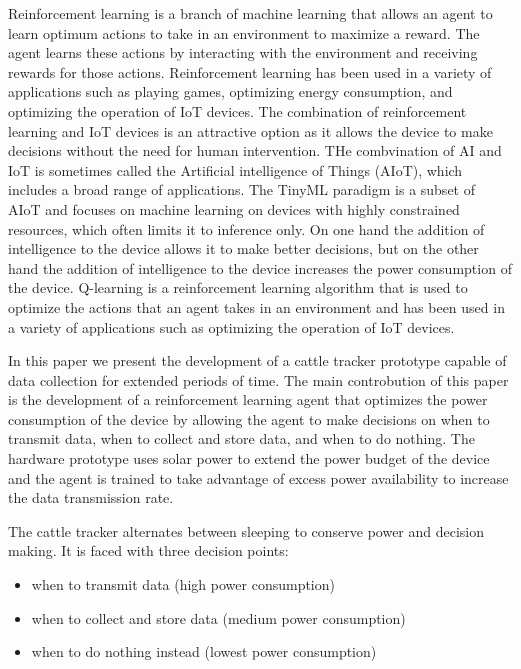 \documentclass[10pt]{cai}
\begin{document}
Reinforcement learning is a branch of machine learning that allows an agent to learn optimum actions to take in an environment to maximize a reward.
The agent learns these actions by interacting with the environment and receiving rewards for those actions.
Reinforcement learning has been used in a variety of applications such as playing games, optimizing energy consumption, and optimizing the operation of IoT devices.
The combination of reinforcement learning and IoT devices is an attractive option as it allows the device to make decisions without the need for human intervention.
THe combvination of AI and IoT is sometimes called the Artificial intelligence of Things (AIoT)\cite{yamsaniIoTBasedLivestockMonitoring2024}, which includes a broad range of applications.
The TinyML paradigm is a subset of AIoT and focuses on machine learning on devices with highly constrained resources, which often limits it to inference only\cite{rayReviewTinyMLStateoftheart2022}.
On one hand the addition of intelligence to the device allows it to make better decisions, but on the other hand the addition of intelligence to the device increases the power consumption of the device.
Q-learning is a reinforcement learning algorithm that is used to optimize the actions that an agent takes in an environment and has been used in a variety of applications such as optimizing the operation of IoT devices.

In this paper we present the development of a cattle tracker prototype capable of data collection for extended periods of time.
The main controbution of this paper is the development of a reinforcement learning agent that optimizes the power consumption of the device by allowing the agent to make decisions on when to transmit data, when to collect and store data, and when to do nothing.
The hardware prototype uses solar power to extend the power budget of the device and the agent is trained to take advantage of excess power availability to increase the data transmission rate.

The cattle tracker alternates between sleeping to conserve power and decision making. 
It is faced with three decision points: 

\begin{itemize}
  \item when to transmit data (high power consumption)
  \item when to collect and store data (medium power consumption)
  \item when to do nothing instead (lowest power consumption)
\end{itemize}
\end{document}
